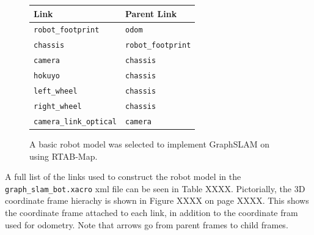 \documentclass[a4paper]{article}
\begin{document}
\begin{figure}[h]
\begin{minipage}{0.45\textwidth}
	\centering
	\caption{A basic robot model was selected to implement GraphSLAM on using RTAB-Map.}
\end{minipage}
\hspace{1cm}
\begin{minipage}{0.45\textwidth}
	\begin{tabular}{ll}
		\toprule
		\textbf{Link} & \textbf{Parent Link} \\
		\midrule
		\texttt{robot\_footprint} & \texttt{odom} \\
		\texttt{chassis} & \texttt{robot\_footprint} \\
		\texttt{camera} & \texttt{chassis} \\
		\texttt{hokuyo} & \texttt{chassis} \\
		\texttt{left\_wheel} & \texttt{chassis} \\
		\texttt{right\_wheel} & \texttt{chassis} \\
		\texttt{camera\_link\_optical} & \texttt{camera} \\
		\bottomrule
	\end{tabular}
\end{minipage}
\end{figure}

A full list of the links used to construct the robot model in the \texttt{graph\_slam\_bot.xacro} xml file can be seen in Table XXXX. Pictorially, the 3D coordinate frame hierachy is shown in Figure XXXX on page XXXX. This shows the coordinate frame attached to each link, in addition to the coordinate fram used for odometry. Note that arrows go from parent frames to child frames. 
\end{document}

